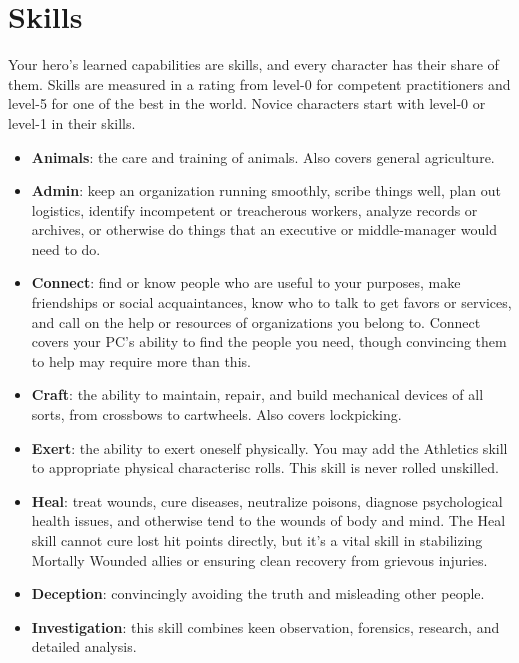 \documentclass[itdr/core]{subfiles}
\begin{document}
\section{Skills} 
Your hero's learned capabilities are skills, and every character has their share of them. Skills are measured in a rating from level-0 for competent practitioners and level-5 for one of the best in the world. Novice characters start with level-0 or level-1 in their skills.

\begin{itemize}
\item \textbf{Animals}: the care and training of animals. Also covers general agriculture.

\item \textbf{Admin}:  keep an organization running smoothly, scribe things well, plan out logistics, identify incompetent or treacherous workers, analyze records or archives, or otherwise do things that an executive or middle-manager would need to do.

\item \textbf{Connect}: find or know people who are useful to your purposes, make friendships or social acquaintances, know who to talk to get favors or services, and call on the help or resources of organizations you belong to. Connect covers your PC’s ability to find the people you need, though convincing them to help may require more than this.

\item \textbf{Craft}: the ability to maintain, repair, and build mechanical devices of all sorts, from crossbows to cartwheels. Also covers lockpicking.

\item \textbf{Exert}: the ability to exert oneself physically. You may add the Athletics skill to appropriate physical characterisc rolls. This skill is never rolled unskilled.

\item \textbf{Heal}: treat wounds, cure diseases, neutralize poisons, diagnose psychological health issues, and otherwise tend to the wounds of body and mind. The Heal skill cannot cure lost hit points directly, but it’s a vital skill in stabilizing Mortally Wounded allies or ensuring clean recovery from grievous injuries.

\item \textbf{Deception}: convincingly avoiding the truth and misleading other people.

\item \textbf{Investigation}: this skill combines keen observation, forensics, research, and detailed analysis.


\end{itemize}
\end{document}

